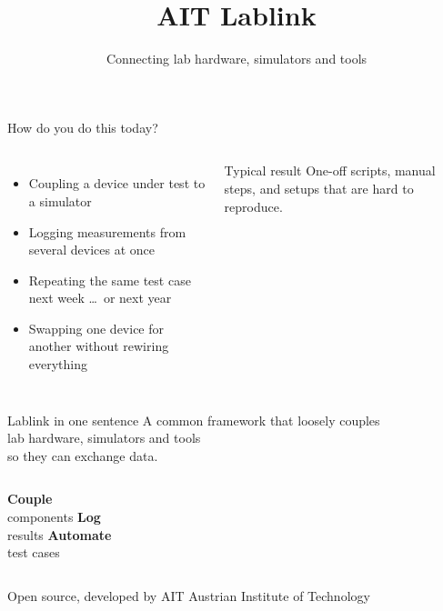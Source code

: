 \documentclass[aspectratio=169,11pt]{beamer}
\title{AIT Lablink}
\subtitle{Connecting lab hardware, simulators and tools}
\author{}
\date{}
\begin{document}
\maketitle

\begin{frame}{How do you do this today?}
  \begin{columns}[T]
    \begin{itemize}
      \item Coupling a device under test to a \alert{simulator}
      \item \alert{Logging} measurements from several devices at once
      \item \alert{Repeating} the same test case next week \dots\ or next year
      \item Swapping one device for another without rewiring everything
    \end{itemize}
    \vspace{0.6cm}
    \begin{block}{Typical result}
      One-off scripts, manual steps, and setups that are hard to reproduce.
    \end{block}
  \end{columns}
\end{frame}

\begin{frame}{Lablink in one sentence}
  \centering
  \Large
  A common framework that \alert{loosely couples}\\
  lab hardware, simulators and tools\\
  so they can \alert{exchange data}.
  \vspace{1cm}

  \normalsize
  \begin{columns}[T]
    \centering
    \textbf{Couple}\\ components
    \centering
    \textbf{Log}\\ results
    \centering
    \textbf{Automate}\\ test cases
  \end{columns}
  \vspace{0.8cm}

  \small Open source, developed by AIT Austrian Institute of Technology
\end{frame}
\end{document}

